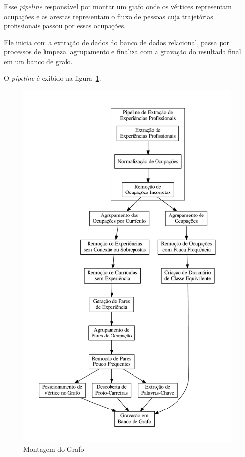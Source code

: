 \documentclass[12pt,a4paper]{article}
\begin{document}
Esse \textit{pipeline} responsável por montar um grafo onde os vértices representam ocupações e as arestas representam o fluxo de pessoas cuja trajetórias profissionais passou por essas ocupações.

Ele inicia com a extração de dados do banco de dados relacional, passa por processos de limpeza, agrupamento e finaliza com a gravação do resultado final em um banco de grafo.

O \textit{pipeline} é exibido na figura~\ref{fig:montagem-do-grafo}.

\begin{figure}[ht]
  \centering
  \includegraphics[scale=0.4]{pipeline1.pdf}
  \caption{Montagem do Grafo}
  \label{fig:montagem-do-grafo}
\end{figure}
\end{document}
